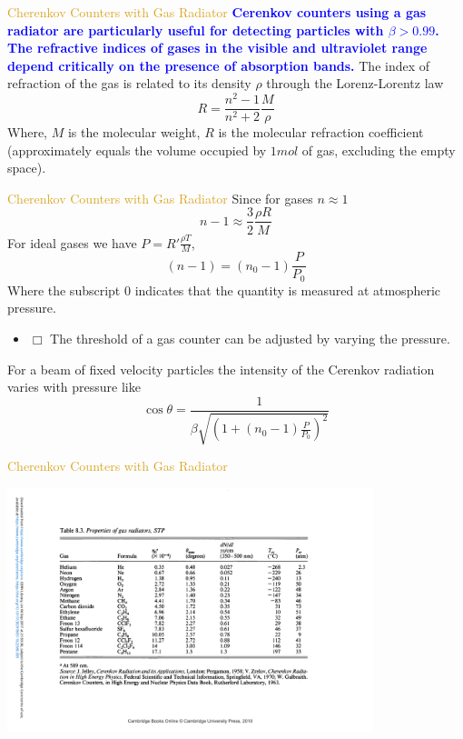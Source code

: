 \documentclass[11pt]{beamer} %
\renewcommand{\(}{\begin{columns}}
\renewcommand{\)}{\end{columns}}
\newcommand{\<}[1]{\begin{column}{#1}}
\renewcommand{\>}{\end{column}}
\newcommand{\itt}{\begin{itemize}}
\newcommand{\tti}{\end{itemize}}
\newcommand{\img}[1]{\texttt{[image: ./Images/\#1]}}
\newcommand{\hlt}[2]{\textcolor{#1}{\textbf{#2}}}
\begin{document}
\begin{frame}{\textcolor{Goldenrod}{Cherenkov Counters with Gas Radiator}}
\hlt{Blue}{Cerenkov counters using a gas radiator are particularly useful for
detecting particles with $\beta > 0.99$. The refractive indices of
gases in the visible and ultraviolet range depend critically on the presence
of absorption bands.} \alert{The index of refraction of the gas is related to
its density $\rho$ through the Lorenz-Lorentz law}
\[
  R = \frac{n^2 -1}{n^2 + 2}\frac{M}{\rho} 
\]
Where, $M$ is the molecular weight, $R$ is the molecular refraction
coefficient (approximately equals the volume occupied by $1 mol$ of gas,
excluding the empty space).

\end{frame}
\begin{frame}{\textcolor{Goldenrod}{Cherenkov Counters with Gas
      Radiator}}
  Since for gases $n \approx 1$
  \[
    n -1 \approx \frac{3}{2}\frac{\rho R}{M}
  \]
  For ideal gases we have $ P = R' \frac{\rho T}{M}$,
  \[
    (n-1) = (n_0 -1 )\frac{P}{P_0}
  \]
  Where the subscript $0$ indicates that the quantity is measured at
  atmospheric pressure.
  \itt
\item[$\Box$] The threshold of a gas counter can be adjusted by
  varying the pressure.
  \tti
  For a beam of fixed velocity particles the intensity of the
  Cerenkov radiation varies with pressure like
  \[
    \cos\theta = \frac{1}{\beta\sqrt{(1 + (n_0 - 1)\frac{P}{P_0})^2}}
  \]
\end{frame}

  
  

\begin{frame}{\textcolor{Goldenrod}{Cherenkov Counters with Gas
      Radiator}}
  \begin{center}
    \includegraphics[width=0.8\textwidth, height=0.6\textheight]{./Images/gas_radiators}
  \end{center}
\end{frame}  
\end{document}
